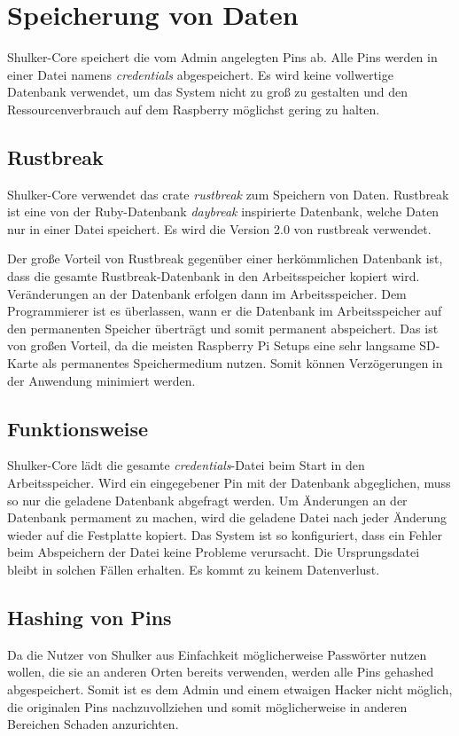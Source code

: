 \chapter{Speicherung von Daten}
Shulker-Core speichert die vom Admin angelegten Pins ab. Alle Pins werden in einer Datei namens \textit{credentials} abgespeichert.
Es wird keine vollwertige Datenbank verwendet, um das System nicht zu groß zu gestalten und den Ressourcenverbrauch auf dem 
Raspberry möglichst gering zu halten.

\section{Rustbreak}
Shulker-Core verwendet das crate \textit{rustbreak} zum Speichern von Daten. Rustbreak ist eine von der Ruby-Datenbank \textit{daybreak} inspirierte
Datenbank, welche Daten nur in einer Datei speichert. Es wird die Version 2.0 von rustbreak verwendet.

Der große Vorteil von Rustbreak gegenüber einer herkömmlichen Datenbank ist, dass die gesamte Rustbreak-Datenbank in den
Arbeitsspeicher kopiert wird. Veränderungen an der Datenbank erfolgen dann im Arbeitsspeicher. Dem Programmierer ist es überlassen,
wann er die Datenbank im Arbeitsspeicher auf den permanenten Speicher überträgt und somit permanent abspeichert. Das ist von großen Vorteil,
da die meisten Raspberry Pi Setups eine sehr langsame SD-Karte als permanentes Speichermedium nutzen. Somit können Verzögerungen in der
Anwendung minimiert werden.

\section{Funktionsweise}
Shulker-Core lädt die gesamte \textit{credentials}-Datei beim Start in den Arbeitsspeicher. Wird ein eingegebener Pin
mit der Datenbank abgeglichen, muss so nur die geladene Datenbank abgefragt werden. Um Änderungen an der Datenbank permament zu 
machen, wird die geladene Datei nach jeder Änderung wieder auf die Festplatte kopiert. Das System ist so konfiguriert, dass
ein Fehler beim Abspeichern der Datei keine Probleme verursacht. Die Ursprungsdatei bleibt in solchen Fällen erhalten. Es kommt 
zu keinem Datenverlust.

\section{Hashing von Pins}
Da die Nutzer von Shulker aus Einfachkeit möglicherweise Passwörter nutzen wollen, die sie an anderen Orten bereits verwenden, werden
alle Pins gehashed abgespeichert. Somit ist es dem Admin und einem etwaigen Hacker nicht möglich, die originalen Pins nachzuvollziehen und
somit möglicherweise in anderen Bereichen Schaden anzurichten.

